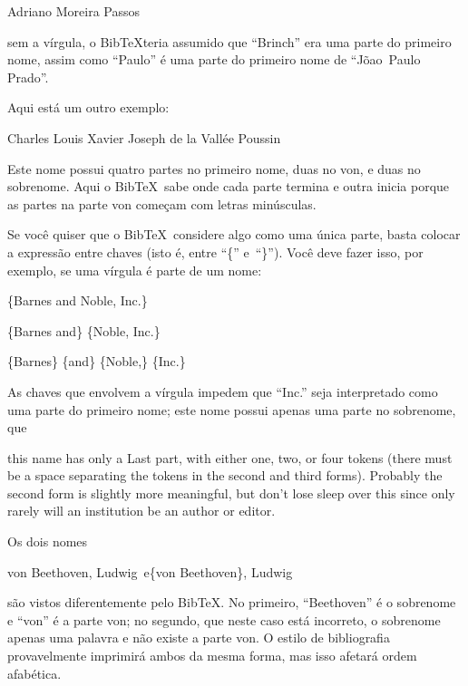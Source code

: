 \documentclass[article,openany]{memoir}
\newenvironment{exemplo}{\begin{center}}{\end{center}}
\begin{document}
\begin{exemplo}
Adriano Moreira Passos
\end{exemplo}

sem a vírgula, o Bib\TeX teria assumido que ``Brinch'' era uma parte
do primeiro nome, assim como ``Paulo'' é uma parte do primeiro nome de
``Jõao~Paulo Prado''.

Aqui está um outro exemplo:

\begin{exemplo}
Charles Louis Xavier Joseph de la Vallée Poussin
\end{exemplo}

Este nome possui quatro partes no primeiro nome, duas no von, e duas
no sobrenome. Aqui o Bib\TeX\ sabe onde cada parte termina e outra
inicia porque as partes na parte von começam com letras minúsculas.

Se você quiser que o Bib\TeX\ considere algo como uma única parte,
basta colocar a expressão entre chaves (isto é, entre ``\{''
e~``\}''). Você deve fazer isso, por exemplo, se uma vírgula é parte
de um nome:

\begin{exemplo}
\begin{minipage}{5cm}
\{Barnes and Noble, Inc.\}

\{Barnes and\} \{Noble, Inc.\}

\{Barnes\} \{and\} \{Noble,\} \{Inc.\}
\end{minipage}
\end{exemplo}

As chaves que envolvem a vírgula impedem que ``Inc.'' seja
interpretado como uma parte do primeiro nome; este nome possui apenas
uma parte no sobrenome, que

 this name has only a Last part, with either one, two, or four tokens
 (there must be a space separating the tokens in the second and third
 forms). Probably the second form is slightly more meaningful, but
 don't lose sleep over this since only rarely will an institution be
 an author or editor.

Os dois nomes
\begin{exemplo}
von Beethoven, Ludwig\quad\ e\quad \{von Beethoven\}, Ludwig
\end{exemplo}
são vistos diferentemente pelo Bib\TeX. No primeiro, ``Beethoven'' é o
sobrenome e ``von'' é a parte von; no segundo, que neste caso está
incorreto, o sobrenome apenas uma palavra e não existe a parte von. O
estilo de bibliografia provavelmente imprimirá ambos da mesma forma,
mas isso afetará ordem afabética.
\end{document}
